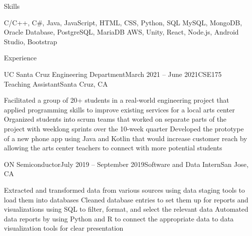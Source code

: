 \documentclass[11pt,fit=false]{cv_template}
\begin{document}
\begin{cv}
\begin{cvsection}{Skills}

\descitem[Languages] C/C++, C\#, Java, JavaScript, HTML, CSS, Python, SQL
\descitem[Databases] MySQL, MongoDB, Oracle Database, PostgreSQL, MariaDB
\descitem[Utilities] AWS, Unity, React, Node.js, Android Studio, Bootstrap

\end{cvsection}


\begin{cvsection}{Experience}


\begin{cvsubsection}
{UC Santa Cruz Engineering Department}{March 2021 -- June 2021}{CSE175 Teaching Assistant}{Santa Cruz, CA}

\listitem Facilitated a group of 20+ students in a real-world engineering project that applied programming skills to improve existing services for a local arts center
\listitem Organized students into scrum teams that worked on separate parts of the project with weeklong sprints over the 10-week quarter
\listitem Developed the prototype of a new phone app using Java and Kotlin that would increase customer reach by allowing the arts center teachers to connect with more potential students


\end{cvsubsection}


\begin{cvsubsection}
{ON Semiconductor}{July 2019 -- September 2019}{Software and Data Intern}{San Jose, CA}

\listitem Extracted and transformed data from various sources using data staging tools to load them into databases
\listitem Cleaned database entries to set them up for reports and visualizations using SQL to filter, format, and select the relevant data
\listitem Automated data reports by using Python and R to connect the appropriate data to data visualization tools for clear presentation


\end{cvsubsection}
\end{cvsection}
\end{cv}
\end{document}
